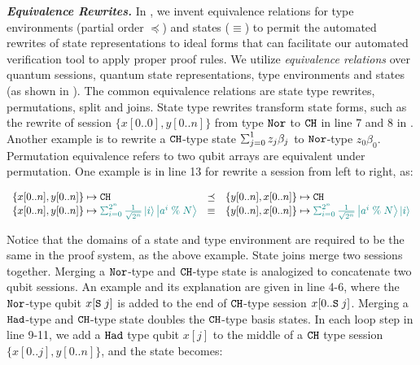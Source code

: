\noindent\textbf{\textit{Equivalence Rewrites.}}\label{sec:conditionals}
In \qafny, we invent equivalence relations for type environments (partial order $\preceq$) and states ($\equiv$) to permit the automated rewrites of state representations to ideal forms that can facilitate our automated verification tool to apply proper proof rules.
We utilize \emph{equivalence relations} over quantum sessions, quantum state representations, type environments and states (as shown in ). 
The common equivalence relations are state type rewrites, permutations, split and joins. 
State type rewrites transform state forms, such as the rewrite of session $\{x[0..0],y[0..n]\}$ from type $\texttt{Nor}$ to $\texttt{CH}$ in line 7 and 8 in . Another example is to rewrite a $\texttt{CH}$-type state $\ssum{j=0}{1}{z_j\beta_j}$ to $\texttt{Nor}$-type ${z_0\beta_0}$.
Permutation equivalence refers to two qubit arrays are equivalent under permutation. One example is in line 13 for rewrite a session from left to right, as:

{\footnotesize
\begin{center}
$\begin{array}{lcl}
\{x[0..n],y[0..n]\}\mapsto \tcht &\preceq& \{y[0..n],x[0..n]\}\mapsto \tcht 
\\
\{x[0..n],y[0..n]\} \mapsto \textcolor{teal}{\schai{2^{n}}{\frac{1}{\sqrt{2^{n}}}}{i}{\ket{a^{i}\;\%\;N}}} &\equiv& \{y[0..n],x[0..n]\} \mapsto \textcolor{teal}{\schai{2^{n}}{\frac{1}{\sqrt{2^{n}}}}{a^{i}\;\%\;N}{\ket{i}}}
\end{array}
$
\end{center}
}

Notice that the domains of a state and type environment are required to be the same in the \qafny proof system, as the above example.
State joins merge two sessions together. Merging a $\texttt{Nor}$-type and $\texttt{CH}$-type state is analogized to concatenate two qubit sessions.
An example and its explanation are given in  line 4-6, 
where the $\texttt{Nor}$-type qubit $x[\texttt{S}\;j]$ is added to the end of $\texttt{CH}$-type session $x[0..\texttt{S}\;j]$.
Merging a $\texttt{Had}$-type and $\texttt{CH}$-type state doubles the $\texttt{CH}$-type basis states. 
In each loop step in  line 9-11, we add a $\texttt{Had}$ type qubit $x[j]$ to the middle of a $\texttt{CH}$ type session $\{x[0..j],y[0..n]\}$, and the state becomes:

